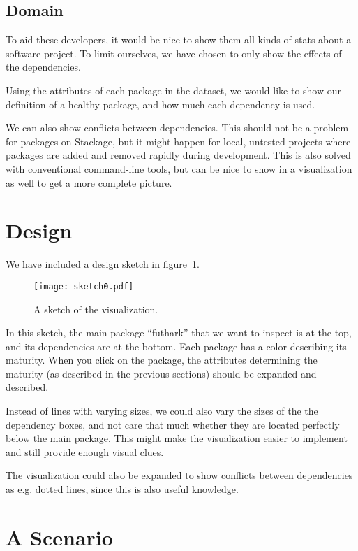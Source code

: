 \documentclass[a4paper,12pt]{article}
\begin{document}
\subsection{Domain}

To aid these developers, it would be nice to show them all kinds of stats about
a software project.  To limit ourselves, we have chosen to only show the effects
of the dependencies.

Using the attributes of each package in the dataset, we would like to show our
definition of a healthy package, and how much each dependency is used.

We can also show conflicts between dependencies.  This should not be a problem
for packages on Stackage, but it might happen for local, untested projects where
packages are added and removed rapidly during development.  This is also solved
with conventional command-line tools, but can be nice to show in a visualization
as well to get a more complete picture.


\section{Design}

We have included a design sketch in figure~\ref{fig:sketch0}.

\begin{figure}[h!]
\begin{center}
\texttt{[image: sketch0.pdf]}
\caption{A sketch of the visualization.}
\label{fig:sketch0}
\end{center}
\end{figure}

In this sketch, the main package ``futhark'' that we want to inspect is at the
top, and its dependencies are at the bottom.  Each package has a color
describing its maturity.  When you click on the package, the attributes
determining the maturity (as described in the previous sections) should be
expanded and described.

Instead of lines with varying sizes, we could also vary the sizes of the the
dependency boxes, and not care that much whether they are located perfectly
below the main package.  This might make the visualization easier to implement
and still provide enough visual clues.

The visualization could also be expanded to show conflicts between dependencies
as e.g. dotted lines, since this is also useful knowledge.


\section{A Scenario}
\end{document}
